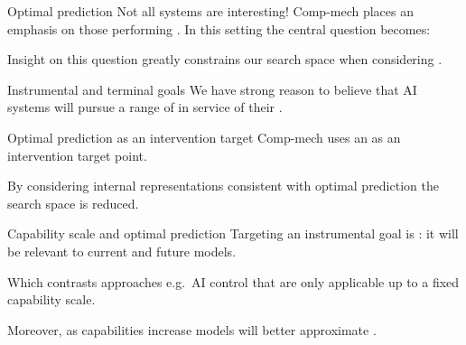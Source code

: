 \documentclass[aspectratio=169,12pt,t]{beamer}
\begin{document}
\begin{frame}{Optimal prediction}
  Not all systems are interesting! Comp-mech places an emphasis on those
  performing . In this setting the central question becomes:
  \vspace{5mm}

  {\centering
    \setlength{\fboxsep}{3mm}
    \setlength{\fboxrule}{0.6pt}
    \par}
  \vspace{5mm}

  Insight on this question greatly constrains our search space when
  considering .
\end{frame}

\begin{frame}{Instrumental and terminal goals}
  We have strong reason to believe that AI systems will pursue a range of
   in service of their .
  \begin{center}\end{center}
\end{frame}

\begin{frame}{Optimal prediction as an intervention target}
  Comp-mech uses an  as an intervention target point.
  \begin{center}\end{center}
  By considering internal representations consistent with optimal prediction
  the search space is reduced.
\end{frame}

\begin{frame}{Capability scale and optimal prediction}
  Targeting an instrumental goal is : it will be relevant
  to current and future models.
  \begin{center}\end{center}
  {\small
  Which contrasts  approaches e.g.\ AI control that are
  only applicable up to a fixed capability scale.

  Moreover, as capabilities increase models will better approximate
  .\par}
\end{frame}
\end{document}
